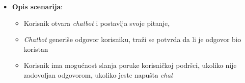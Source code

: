 \begin{itemize}
    \item \textbf{Opis scenarija}:  
    \begin{itemize}[label={--}]
        \item Korisnik otvara \textit{chatbot} i postavlja svoje pitanje,

        \item \textit{Chatbot} generiše odgovor korisniku, traži se potvrda da li je odgovor bio koristan

        \item Korisnik ima mogućnost slanja poruke korisničkoj podršci, ukoliko nije zadovoljan odgovorom, ukoliko jeste napušta \textit{chat}
    \end{itemize}
    
\end{itemize}  


\sloppy  
